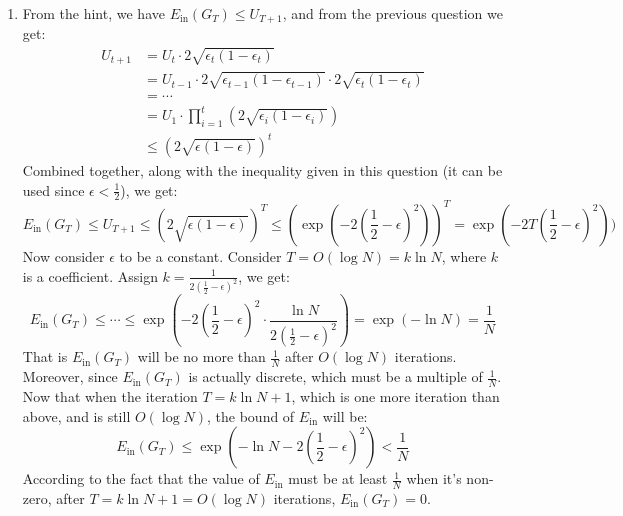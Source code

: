 \documentclass[11pt]{article}
\begin{document}
\begin{enumerate}[label=\textbf{\arabic*}.]
  \item From the hint, we have $E_\text{in} (G_T) \leq U_{T+1}$, and from the previous question we get: \[\begin{aligned} U_{t+1} &= U_t \cdot 2 \sqrt{\epsilon_t (1 - \epsilon_t)} \\ &= U_{t-1} \cdot 2 \sqrt{\epsilon_{t-1}(1-\epsilon_{t-1})} \cdot 2  \sqrt{\epsilon_t (1 - \epsilon_t)} \\ &= \cdots \\ &= U_1 \cdot \prod_{i=1}^t (2\sqrt{\epsilon_i (1-\epsilon_i)}) \\&\leq (2\sqrt{\epsilon (1-\epsilon)})^t \end{aligned}\]
  Combined together, along with the inequality given in this question (it can be used since $\epsilon < \frac{1}{2}$), we get:
  \[E_\text{in} (G_T) \leq U_{T+1} \leq (2\sqrt{\epsilon (1-\epsilon)})^T \leq \left(\exp(-2(\frac{1}{2}-\epsilon)^2)\right)^T = \exp(-2T(\frac{1}{2}-\epsilon)^2))\]
  Now consider $\epsilon$ to be a constant. Consider $T = O(\log N) = k \ln N$, where $k$ is a coefficient. Assign $k = \frac{1}{2(\frac{1}{2}-\epsilon)^2}$, we get:
  \[E_\text{in} (G_T) \leq \cdots \leq \exp \left(-2(\frac{1}{2}-\epsilon)^2 \cdot \frac{\ln N}{2(\frac{1}{2}-\epsilon)^2}\right) = \exp (-\ln N) = \frac{1}{N}\]
  That is $E_\text{in} (G_T)$ will be no more than $\frac{1}{N}$ after $O(\log N)$ iterations. Moreover, since $E_\text{in} (G_T)$ is actually discrete, which must be a multiple of $\frac{1}{N}$. Now that when the iteration $T = k \ln N + 1$, which is one more iteration than above, and is still $O(\log N)$, the bound of $E_\text{in}$ will be:
  \[E_\text{in} (G_T) \leq \exp (-\ln N - 2(\frac{1}{2}-\epsilon)^2) < \frac{1}{N}\]
  According to the fact that the value of $E_\text{in}$ must be at least $\frac{1}{N}$ when it's non-zero, after $T = k \ln N + 1 = O(\log N)$ iterations, $E_\text{in} (G_T) = 0$.




\end{enumerate}
\end{document}
